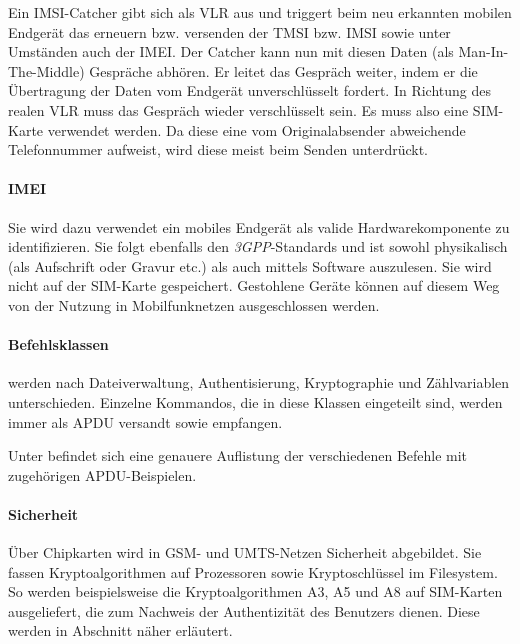 Ein IMSI-Catcher gibt sich als \ac{VLR} aus und triggert beim neu
erkannten mobilen Endgerät das erneuern bzw. versenden der \ac{TMSI}
bzw. \ac{IMSI} sowie unter Umständen auch der \ac{IMEI}. Der Catcher
kann nun mit diesen Daten (als Man-In-The-Middle) Gespräche abhören.
Er leitet das Gespräch weiter, indem er die Übertragung der Daten
vom Endgerät unverschlüsselt fordert. In Richtung des realen \ac{VLR}
muss das Gespräch wieder verschlüsselt sein. Es muss also eine SIM-Karte
verwendet werden. Da diese eine vom Originalabsender abweichende
Telefonnummer aufweist, wird diese meist beim Senden unterdrückt.

\paragraph{IMEI} Sie wird dazu verwendet ein mobiles Endgerät als
valide Hardwarekomponente zu identifizieren. Sie folgt ebenfalls
den \textit{3GPP}-Standards und ist sowohl physikalisch (als
Aufschrift oder Gravur etc.) als auch mittels Software auszulesen.
Sie wird nicht auf der SIM-Karte gespeichert. %
Gestohlene Geräte können auf diesem Weg von der Nutzung in
Mobilfunknetzen ausgeschlossen werden. 


\paragraph{Befehlsklassen} werden nach Dateiverwaltung, Authentisierung, Kryptographie
und Zählvariablen unterschieden\cite{spitz11}. Einzelne Kommandos, die in diese
Klassen eingeteilt sind, werden immer als \ac{APDU} versandt sowie empfangen.

Unter  befindet sich eine genauere
Auflistung der verschiedenen Befehle mit zugehörigen \ac{APDU}-Beispielen.

\paragraph{Sicherheit}
Über Chipkarten wird in \ac{GSM}- und \ac{UMTS}-Netzen Sicherheit abgebildet.
Sie fassen Kryptoalgorithmen auf Prozessoren sowie Kryptoschlüssel im
Filesystem. So werden beispielsweise die Kryptoalgorithmen A3, A5 und A8
auf SIM-Karten ausgeliefert, die zum Nachweis der Authentizität des Benutzers dienen.
Diese werden in Abschnitt 
näher erläutert.

